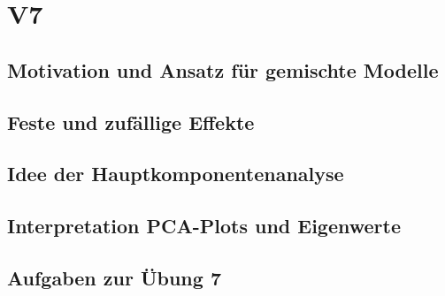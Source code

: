 \section{V7}
\subsection{Motivation und Ansatz für gemischte Modelle}

\subsection{Feste und zufällige Effekte}

\subsection{Idee der Hauptkomponentenanalyse}

\subsection{Interpretation PCA-Plots und Eigenwerte}

\subsection{Aufgaben zur Übung 7}